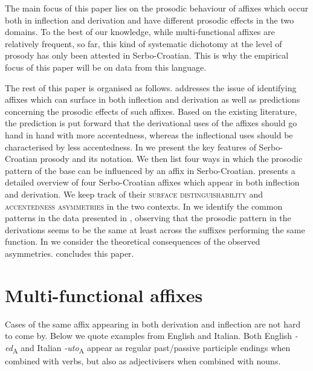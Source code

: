 \documentclass[output=paper]{langsci/langscibook}
\begin{document}
The main focus of this paper lies on the prosodic behaviour of affixes which occur both in inflection and derivation and have different prosodic effects in the two domains. To the best of our knowledge, while multi-functional affixes are relatively frequent, so far, this kind of systematic dichotomy at the level of prosody has only been attested in Serbo-Croatian. This is why the empirical focus of this paper will be on data from this language.\largerpage[1]

The rest of this paper is organised as follows.  addresses the issue of identifying affixes which can surface in both inflection and derivation as well as predictions concerning the prosodic effects of such affixes. Based on the existing literature, the prediction is put forward that the derivational uses of the affixes should go hand in hand with more accentedness, whereas the inflectional uses should be characterised by less accentedness. In  we present the key features of Serbo-Croatian prosody and its notation. We then list four ways in which the prosodic pattern of the base can be influenced by an affix in Serbo-Croatian.  presents a detailed overview of four Serbo-Croatian affixes which appear in both inflection and derivation. We keep track of their \textsc{surface distinguishability} and  \textsc{accentedness asymmetries} in the two contexts. In  we identify the common patterns in the data presented in , observing that the prosodic pattern in the derivations seems to be the same at least across the suffixes performing the same function. In  we consider the theoretical consequences of the observed asymmetries.  concludes this paper.

\section{Multi-functional affixes}\label{sec:simonovic:2}

Cases of the same affix appearing in both derivation and inflection are not hard to come by. Below we quote examples from English and Italian. Both English \textit{-ed}\textsubscript{A} and Italian \textit{-uto}\textsubscript{A} appear as regular past/passive participle endings when combined with verbs, but also as adjectivisers when combined with nouns.
\end{document}
